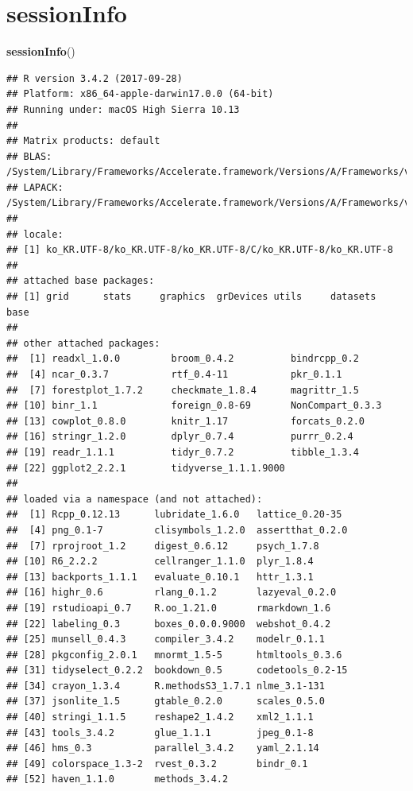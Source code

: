 \documentclass[12pt,]{krantz}
\newenvironment{Shaded}{\begin{snugshade}}{\end{snugshade}}
\newcommand{\KeywordTok}[1]{\textcolor[rgb]{0.13,0.29,0.53}{\textbf{#1}}}
\newcommand{\NormalTok}[1]{#1}
\theoremstyle{definition}
\theoremstyle{definition}
\theoremstyle{definition}
\theoremstyle{remark}
\begin{document}
\chapter*{sessionInfo}\label{sessioninfo}


\begin{Shaded}
\begin{Highlighting}[]
\KeywordTok{sessionInfo}\NormalTok{()}
\end{Highlighting}
\end{Shaded}

\begin{verbatim}
## R version 3.4.2 (2017-09-28)
## Platform: x86_64-apple-darwin17.0.0 (64-bit)
## Running under: macOS High Sierra 10.13
## 
## Matrix products: default
## BLAS: /System/Library/Frameworks/Accelerate.framework/Versions/A/Frameworks/vecLib.framework/Versions/A/libBLAS.dylib
## LAPACK: /System/Library/Frameworks/Accelerate.framework/Versions/A/Frameworks/vecLib.framework/Versions/A/libLAPACK.dylib
## 
## locale:
## [1] ko_KR.UTF-8/ko_KR.UTF-8/ko_KR.UTF-8/C/ko_KR.UTF-8/ko_KR.UTF-8
## 
## attached base packages:
## [1] grid      stats     graphics  grDevices utils     datasets  base     
## 
## other attached packages:
##  [1] readxl_1.0.0         broom_0.4.2          bindrcpp_0.2        
##  [4] ncar_0.3.7           rtf_0.4-11           pkr_0.1.1           
##  [7] forestplot_1.7.2     checkmate_1.8.4      magrittr_1.5        
## [10] binr_1.1             foreign_0.8-69       NonCompart_0.3.3    
## [13] cowplot_0.8.0        knitr_1.17           forcats_0.2.0       
## [16] stringr_1.2.0        dplyr_0.7.4          purrr_0.2.4         
## [19] readr_1.1.1          tidyr_0.7.2          tibble_1.3.4        
## [22] ggplot2_2.2.1        tidyverse_1.1.1.9000
## 
## loaded via a namespace (and not attached):
##  [1] Rcpp_0.12.13      lubridate_1.6.0   lattice_0.20-35  
##  [4] png_0.1-7         clisymbols_1.2.0  assertthat_0.2.0 
##  [7] rprojroot_1.2     digest_0.6.12     psych_1.7.8      
## [10] R6_2.2.2          cellranger_1.1.0  plyr_1.8.4       
## [13] backports_1.1.1   evaluate_0.10.1   httr_1.3.1       
## [16] highr_0.6         rlang_0.1.2       lazyeval_0.2.0   
## [19] rstudioapi_0.7    R.oo_1.21.0       rmarkdown_1.6    
## [22] labeling_0.3      boxes_0.0.0.9000  webshot_0.4.2    
## [25] munsell_0.4.3     compiler_3.4.2    modelr_0.1.1     
## [28] pkgconfig_2.0.1   mnormt_1.5-5      htmltools_0.3.6  
## [31] tidyselect_0.2.2  bookdown_0.5      codetools_0.2-15 
## [34] crayon_1.3.4      R.methodsS3_1.7.1 nlme_3.1-131     
## [37] jsonlite_1.5      gtable_0.2.0      scales_0.5.0     
## [40] stringi_1.1.5     reshape2_1.4.2    xml2_1.1.1       
## [43] tools_3.4.2       glue_1.1.1        jpeg_0.1-8       
## [46] hms_0.3           parallel_3.4.2    yaml_2.1.14      
## [49] colorspace_1.3-2  rvest_0.3.2       bindr_0.1        
## [52] haven_1.1.0       methods_3.4.2
\end{verbatim}
\end{document}
